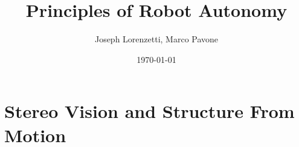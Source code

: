 \documentclass[nohyper,nobib]{tufte-book}
\title{Principles of Robot Autonomy}
\author{Joseph Lorenzetti, Marco Pavone}
\date{\today}
\begin{document}
\chapter{Stereo Vision and Structure From Motion}


\printbibliography
\end{document}
